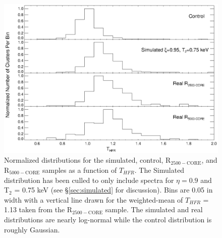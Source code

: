 \documentclass{emulateapj}
\newcommand{\tf}{T_{HFR} }
\begin{document}
{\clearpage
\begin{figure}[htp]
\begin{center}
\includegraphics[scale=1.0]{ft_histo}
\caption{\small Normalized distributions for the simulated, control, 
R$_{2500-\text{CORE}}$, and R$_{5000-\text{CORE}}$ samples as a function of
$\tf$. The Simulated distribution  has been culled to only include
spectra for $\eta = 0.9$ and T$_{2}$ = 0.75 keV (see
\S\ref{sec:simulated} for discussion). Bins are 0.05 in width with a vertical line
drawn for the weighted-mean of $\tf$ = 1.13 taken from the R$_{2500-\text{CORE}}$
sample. The simulated and real distributions are nearly log-normal
while the control distribution is roughly Gaussian.}
\label{fig:ft_histo}
\end{center}
\end{figure}

}
\end{document}
